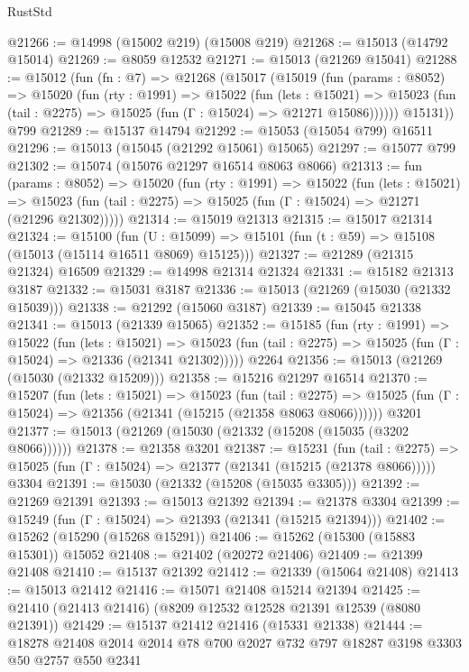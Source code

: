 \begin{lexlean}{RustStd}
\begin{coremodule}
@21266 := @14998 (@15002 @219) (@15008 @219)
@21268 := @15013 (@14792 @15014)
@21269 := @8059 @12532
@21271 := @15013 (@21269 @15041)
@21288 := @15012
    (fun (fn : @7) =>
    @21268
      (@15017
        (@15019
          (fun (params : @8052) =>
          @15020
            (fun (rty : @1991) =>
            @15022
              (fun (lets : @15021) =>
              @15023 (fun (tail : @2275) => @15025 (fun (Γ : @15024) => @21271 @15086))))))
        @15131))
    @799
@21289 := @15137 @14794
@21292 := @15053 (@15054 @799) @16511
@21296 := @15013 (@15045 (@21292 @15061) @15065)
@21297 := @15077 @799
@21302 := @15074 (@15076 @21297 @16514 @8063 @8066)
@21313 := fun (params : @8052) =>
  @15020
    (fun (rty : @1991) =>
    @15022
      (fun (lets : @15021) =>
      @15023 (fun (tail : @2275) => @15025 (fun (Γ : @15024) => @21271 (@21296 @21302)))))
@21314 := @15019 @21313
@21315 := @15017 @21314
@21324 := @15100
    (fun (U : @15099) => @15101 (fun (t : @59) => @15108 (@15013 (@15114 @16511 @8069) @15125)))
@21327 := @21289 (@21315 @21324) @16509
@21329 := @14998 @21314 @21324
@21331 := @15182 @21313 @3187
@21332 := @15031 @3187
@21336 := @15013 (@21269 (@15030 (@21332 @15039)))
@21338 := @21292 (@15060 @3187)
@21339 := @15045 @21338
@21341 := @15013 (@21339 @15065)
@21352 := @15185
    (fun (rty : @1991) =>
    @15022
      (fun (lets : @15021) =>
      @15023 (fun (tail : @2275) => @15025 (fun (Γ : @15024) => @21336 (@21341 @21302)))))
    @2264
@21356 := @15013 (@21269 (@15030 (@21332 @15209)))
@21358 := @15216 @21297 @16514
@21370 := @15207
    (fun (lets : @15021) =>
    @15023
      (fun (tail : @2275) =>
      @15025 (fun (Γ : @15024) => @21356 (@21341 (@15215 (@21358 @8063 @8066))))))
    @3201
@21377 := @15013 (@21269 (@15030 (@21332 (@15208 (@15035 (@3202 @8066))))))
@21378 := @21358 @3201
@21387 := @15231
    (fun (tail : @2275) => @15025 (fun (Γ : @15024) => @21377 (@21341 (@15215 (@21378 @8066)))))
    @3304
@21391 := @15030 (@21332 (@15208 (@15035 @3305)))
@21392 := @21269 @21391
@21393 := @15013 @21392
@21394 := @21378 @3304
@21399 := @15249 (fun (Γ : @15024) => @21393 (@21341 (@15215 @21394)))
@21402 := @15262 (@15290 (@15268 @15291))
@21406 := @15262 (@15300 (@15883 @15301)) @15052
@21408 := @21402 (@20272 @21406)
@21409 := @21399 @21408
@21410 := @15137 @21392
@21412 := @21339 (@15064 @21408)
@21413 := @15013 @21412
@21416 := @15071 @21408 @15214 @21394
@21425 := @21410 (@21413 @21416) (@8209 @12532 @12528 @21391 @12539 (@8080 @21391))
@21429 := @15137 @21412 @21416 (@15331 @21338)
@21444 := @18278 @21408 @2014 @2014 @78 @700 @2027 @732 @797 @18287 @3198 @3303 @50 @2757 @550 @2341

\end{coremodule}
\end{lexlean}
